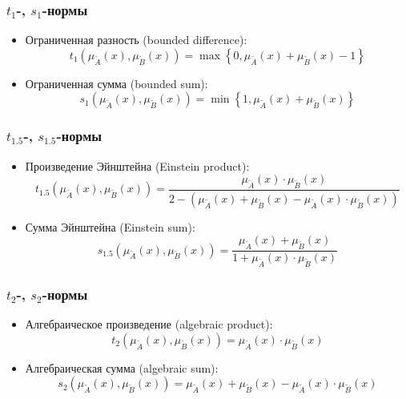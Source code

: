 \documentclass{beamer}
\begin{document}
\begin{frame}\frametitle{$t_1$-, $s_1$-нормы}
    \begin{itemize}
        \item Ограниченная разность (bounded difference):
        \[
            t_1(\mu_{\tilde{A}}(x), \mu_{\tilde{B}}(x)) = 
                \max{\left\{0, \mu_{\tilde{A}}(x) + \mu_{\tilde{B}}(x) - 1 \right\} }
        \]
        \item  Ограниченная сумма (bounded sum):
        \[
            s_1(\mu_{\tilde{A}}(x), \mu_{\tilde{B}}(x)) = 
                \min{\left\{1, \mu_{\tilde{A}}(x) + \mu_{\tilde{B}}(x) \right\} }
        \]
    \end{itemize}
\end{frame}


\begin{frame}\frametitle{$t_{1.5}$-, $s_{1.5}$-нормы}
    \begin{itemize}
        \item Произведение Эйнштейна (Einstein product):
        \[
            t_{1.5}(\mu_{\tilde{A}}(x), \mu_{\tilde{B}}(x)) = 
                \frac{\mu_{\tilde{A}}(x) \cdot \mu_{\tilde{B}}(x)}{2 - (\mu_{\tilde{A}}(x) + \mu_{\tilde{B}}(x) - \mu_{\tilde{A}}(x) \cdot \mu_{\tilde{B}}(x))}
        \]
        \item Сумма Эйнштейна (Einstein sum):
        \[
            s_{1.5}(\mu_{\tilde{A}}(x), \mu_{\tilde{B}}(x)) = \frac{\mu_{\tilde{A}}(x) + \mu_{\tilde{B}}(x)}{1 + \mu_{\tilde{A}}(x) \cdot \mu_{\tilde{B}}(x)}
        \]
    \end{itemize}
\end{frame}

\begin{frame}\frametitle{$t_{2}$-, $s_{2}$-нормы}
    \begin{itemize}
        \item Алгебраическое произведение (algebraic product):
        \[
            t_{2}(\mu_{\tilde{A}}(x), \mu_{\tilde{B}}(x)) = \mu_{\tilde{A}}(x) \cdot \mu_{\tilde{B}}(x)
        \]
        \item Алгебраическая сумма (algebraic sum):
        \[
            s_{2}(\mu_{\tilde{A}}(x), \mu_{\tilde{B}}(x)) = \mu_{\tilde{A}}(x) + \mu_{\tilde{B}}(x) - \mu_{\tilde{A}}(x) \cdot \mu_{\tilde{B}}(x)
        \]
    \end{itemize}
\end{frame}
\end{document}
